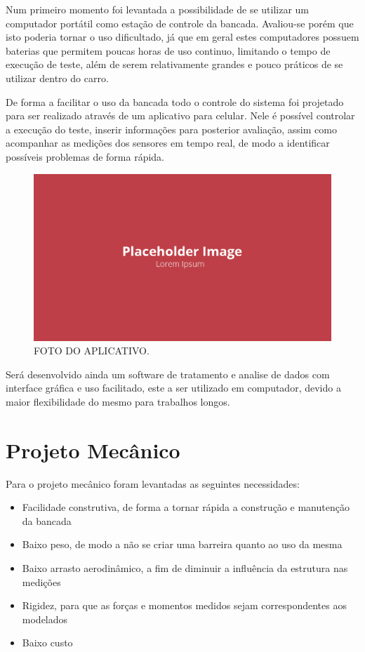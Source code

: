 Num primeiro momento foi levantada a possibilidade de se utilizar um computador portátil como estação de controle da bancada. Avaliou-se porém que isto poderia tornar o uso dificultado, já que em geral estes computadores possuem baterias que permitem poucas horas de uso continuo, limitando o tempo de execução de teste, além de serem relativamente grandes e pouco práticos de se utilizar dentro do carro.

De forma a facilitar o uso da bancada todo o controle do sistema foi projetado para ser realizado através de um aplicativo para celular. Nele é possível controlar a execução do teste, inserir informações para posterior avaliação, assim como acompanhar as medições dos sensores em tempo real, de modo a identificar possíveis problemas de forma rápida.

\begin{figure}[!ht]
    \centering
    \includegraphics[width=.8\linewidth]{figuras/placeholder.png}
    \caption{FOTO DO APLICATIVO\cite{autor}.}
    \label{fig:placeholder}
\end{figure}

Será desenvolvido ainda um software de tratamento e analise de dados com interface gráfica e uso facilitado, este a ser utilizado em computador, devido a maior flexibilidade do mesmo para trabalhos longos.

\section{Projeto Mecânico}

Para o projeto mecânico foram levantadas as seguintes necessidades:

\begin{itemize}
    \item Facilidade construtiva, de forma a tornar rápida a construção e manutenção da bancada
    \item Baixo peso, de modo a não se criar uma barreira quanto ao uso da mesma
    \item Baixo arrasto aerodinâmico, a fim de diminuir a influência da estrutura nas medições
    \item Rigidez, para que as forças e momentos medidos sejam correspondentes aos modelados
    \item Baixo custo
\end{itemize}

